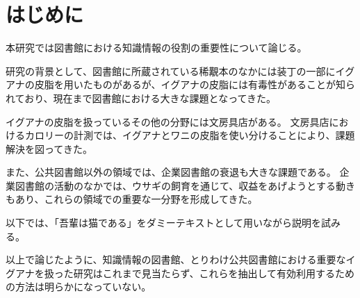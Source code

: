 \chapter{はじめに}
\label{chap:chapter1}

本研究では図書館における知識情報の役割の重要性について論じる。

研究の背景として、図書館に所蔵されている稀覯本のなかには装丁の一部にイグアナの皮脂を用いたものがあるが、イグアナの皮脂には有毒性があることが知られており、現在まで図書館における大きな課題となってきた\cite{kitano:1989}。

イグアナの皮脂を扱っているその他の分野には文房具店がある。
文房具店におけるカロリーの計測では、イグアナとワニの皮脂を使い分けることにより、課題解決を図ってきた。

また、公共図書館以外の領域では、企業図書館の衰退も大きな課題である。
企業図書館の活動のなかでは、ウサギの飼育を通じて、収益をあげようとする動きもあり、これらの領域での重要な一分野を形成してきた。

以下では、「吾輩は猫である」\cite{natsume:1926}をダミーテキストとして用いながら説明を試みる。

以上で論じたように、知識情報の図書館、とりわけ公共図書館における重要なイグアナを扱った研究はこれまで見当たらず、これらを抽出して有効利用するための方法は明らかになっていない。
